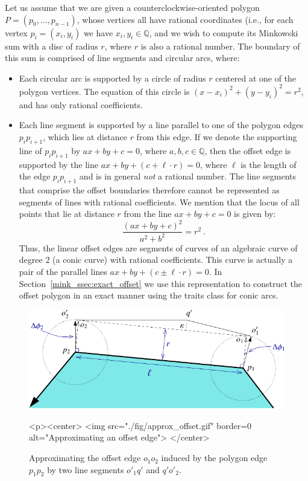 Let us assume that we are given a counterclockwise-oriented polygon
$P = \left( p_0, \ldots, p_{n-1} \right)$, whose vertices all have rational
coordinates (i.e., for each vertex $p_i = (x_i, y_i)$ we have
$x_i, y_i \in {\mathbb Q}$, and we wish to compute its Minkowski sum with a
disc of radius $r$, where $r$ is also a rational number. The boundary of this
sum is comprised of line segments and circular arcs, where:
\begin{itemize}
\item
Each circular arc is supported by a circle of radius $r$ centered at one
of the polygon vertices. The equation of this circle is $(x - x_i)^2 +
(y - y_i)^2 = r^2$, and has only rational coefficients.
%
\item
Each line segment is supported by a line parallel to one of the polygon
edges $p_i p_{i+1}$, which lies at distance $r$ from this edge. If we 
denote the supporting line of $p_i p_{i+1}$ by $ax + by + c = 0$, where
$a, b, c \in {\mathbb Q}$, then the offset edge is supported by the line
$ax + by + (c + \ell\cdot r) = 0$, where $\ell$ is the length of the edge
$p_i p_{i+1}$ and is in general \emph{not} a rational number. The line segments
that comprise the offset boundaries therefore cannot be represented as segments
of lines with rational coefficients.
%
We mention that the locus of all points that lie at distance $r$ from the
line $ax + by + c = 0$ is given by:
\[ \frac{(ax + by + c)^2}{a^2 + b^2} = r^2 \ .\]
Thus, the linear offset edges are segments of curves of an algebraic curve
of degree 2 (a conic curve) with rational coefficients. This curve is
actually a pair of the parallel lines $ax + by + (c \pm \ell\cdot r) = 0$.
In Section~\ref{mink_ssec:exact_offset} we use this representation to
construct the offset polygon in an exact manner using the traits class for
conic arcs.
\end{itemize}

\begin{figure}[t]
\begin{ccTexOnly}
  \begin{center}
  \includegraphics{Minkowski_sum_2/fig/approx_offset}
  \end{center}
\end{ccTexOnly}
\begin{ccHtmlOnly}
  <p><center>
  <img src="./fig/approx_offset.gif" border=0 alt="Approximating an offset edge">
  </center>
\end{ccHtmlOnly}
\caption{Approximating the offset edge $o_1 o_2$ induced by the polygon
edge $p_1 p_2$ by two line segments $o'_1 q'$ and $q' o'_2$.}
\label{mink_fig:approx_offset}
\end{figure}

